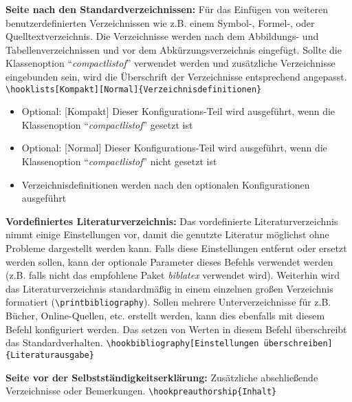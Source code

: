 \documentclass[
%
	thesis=paper,		%
	compactlistof,		%
	noauthorship,		%
%
	fancy,				%
%
%
]{hsmw-thesis}
\begin{document}
	\textbf{Seite nach den Standardverzeichnissen:}\label{cmd:hooklists}
	Für das Einfügen von weiteren benutzerdefinierten Verzeichnissen wie z.B. einem Symbol-, Formel-, oder Quelltextverzeichnis.
	Die Verzeichnisse werden nach dem Abbildungs- und Tabellenverzeichnissen und vor dem Abkürzungsverzeichnis eingefügt.
	Sollte die Klassenoption \enquote{\textit{compactlistof}} verwendet werden und zusätzliche Verzeichnisse eingebunden sein, wird die Überschrift der Verzeichnisse entsprechend angepasst.
	\newline
	\verb|\hooklists[Kompakt][Normal]{Verzeichnisdefinitionen}|
	\begin{itemize}
		\item Optional: [Kompakt] Dieser Konfigurations-Teil wird ausgeführt, wenn die Klassenoption \enquote{\textit{compactlistof}} gesetzt ist
		\item Optional: [Normal] Dieser Konfigurations-Teil wird ausgeführt, wenn die Klassenoption \enquote{\textit{compactlistof}} nicht gesetzt ist
		\item Verzeichnisdefinitionen werden nach den optionalen Konfigurationen ausgeführt
	\end{itemize}
	
	
	\textbf{Vordefiniertes Literaturverzeichnis:}\label{cmd:hookbibliography}
	Das vordefinierte Literaturverzeichnis nimmt einige Einstellungen vor, damit die genutzte Literatur möglichst ohne Probleme dargestellt werden kann.
	Falls diese Einstellungen entfernt oder ersetzt werden sollen, kann der optionale Parameter dieses Befehls verwendet werden (z.B. falls nicht das empfohlene Paket \textit{biblatex} verwendet wird).
	Weiterhin wird das Literaturverzeichnis standardmäßig in einem einzelnen großen Verzeichnis formatiert (\verb|\printbibliography|).
	Sollen mehrere Unterverzeichnisse für z.B. Bücher, Online-Quellen, etc. erstellt werden, kann dies ebenfalls mit diesem Befehl konfiguriert werden.
	Das setzen von Werten in diesem Befehl überschreibt das Standardverhalten.
	\newline
	\verb|\hookbibliography[Einstellungen überschreiben]{Literaturausgabe}|
	
	\textbf{Seite vor der Selbstständigkeitserklärung:}\label{cmd:hookpreauthorship}
	Zusätzliche abschließende Verzeichnisse oder Bemerkungen.
	\newline
	\verb|\hookpreauthorship{Inhalt}|
	
\end{document}
